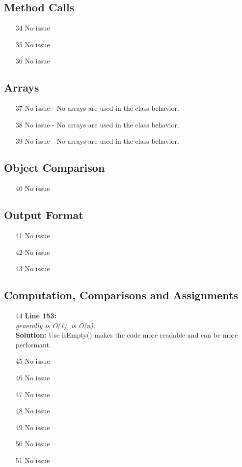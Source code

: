 \subsection{Method Calls}
\begin{itemize}
	\item[34] No issue
	\item[35] No issue
	\item[36] No issue 
\end{itemize}
\subsection{Arrays}
\begin{itemize}
	\item[37] No issue - No arrays are used in the class behavior.
	\item[38] No issue - No arrays are used in the class behavior.
	\item[39] No issue - No arrays are used in the class behavior.
\end{itemize}

\subsection{Object Comparison}
\begin{itemize}
\item[40] No issue 
\end{itemize}
\subsection{Output Format}
\begin{itemize}
\item[41] No issue 
\item[42] No issue
\item[43] No issue 
\end{itemize}
\subsection{Computation, Comparisons and Assignments}
\begin{itemize}
\item[44]  \textbf{Line 153:}\\
\textit{ generally is O(1),}  \textit{is O(n).}\\
\textbf{Solution:}	Use isEmpty() makes the code more readable and can be more performant.  
\item[45] No issue 
\item[46] No issue 
\item[47] No issue
\item[48] No issue 
\item[49] No issue 
\item[50] No issue
\item[51] No issue 

\end{itemize}

